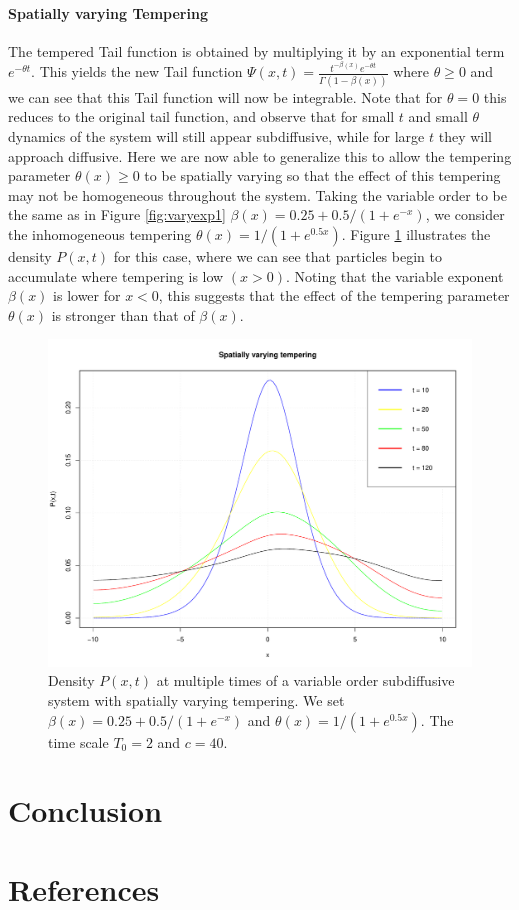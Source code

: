 \documentclass[a4paper,12pt]{elsarticle}
\numberwithin{equation}{section}
\theoremstyle{plain}
\theoremstyle{definition}
\theoremstyle{remark}
\numberwithin{equation}{section}
\newcommand{\1}{\mathbf 1}
\begin{document}
\paragraph{Spatially varying Tempering}  The tempered Tail function is obtained by multiplying it by an exponential term $e^{-\theta  t}$. This yields the new Tail function $\Psi(x,t) = \frac{t^{-\beta(x)} e^{-\theta  t}}{\Gamma (1-\beta(x))}$ where $\theta \geq 0$ and we can see that this Tail function will now be integrable. Note that for $\theta = 0$ this reduces to the original tail function, and observe that for small $t$ and small $\theta$ dynamics of the system will still appear subdiffusive, while for large $t$ they will approach diffusive. Here we are now able to generalize this to allow the tempering parameter $\theta (x) \geq 0$ to be spatially varying so that the effect of this tempering may not be homogeneous throughout the system. Taking the variable order to be the same as in Figure \ref{fig:varyexp1} $\beta(x) = 0.25 + 0.5/(1+e^{-x})$, we consider the inhomogeneous tempering $\theta (x) = 1/(1+e^{0.5x})$. Figure \ref{fig:varytempering} illustrates the density $P(x,t)$ for this case, where we can see that particles begin to accumulate where tempering is low $(x>0)$. Noting that the variable exponent $\beta(x)$ is lower for $x<0$, this suggests that the effect of the tempering parameter $\theta (x)$ is stronger than that of $\beta(x)$. \\ 

\begin{figure}[h]
\includegraphics[scale=0.6]{varytempering}
\caption{\label{fig:varytempering}
Density $P(x,t)$ at multiple times of a variable order subdiffusive system with spatially varying tempering. We set $\beta(x) = 0.25 + 0.5/(1+e^{-x})$ and $\theta (x) = 1/(1+e^{0.5x})$. The time scale $T_0 = 2$ and $c = 40$.}
\end{figure}



\section{Conclusion}

\section*{References}


\end{document}
